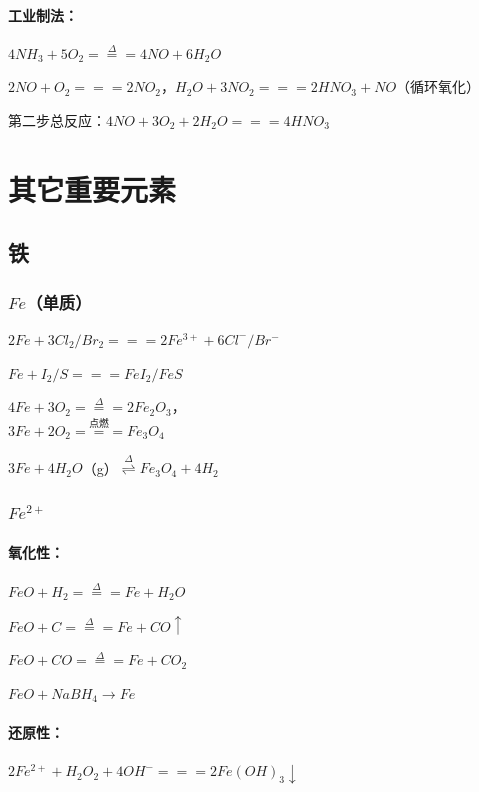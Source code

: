 \documentclass[UTF8,zihao=-4,openany]{ctexbook}
\begin{document}
\subsubsection{工业制法：}
$4NH_3+5O_2\stackrel{\Delta}{=\!=\!=}4NO+6H_2O$\par

$2NO+O_2=\!=\!=2NO_2$，$H_2O+3NO_2=\!=\!=2HNO_3+NO$（循环氧化）\par

第二步总反应：$4NO+3O_2+2H_2O=\!=\!=4HNO_3$\par
\chapter{其它重要元素}
\section{铁}
\subsection{$Fe$（单质）}
$2Fe+3Cl_2/Br_2=\!=\!=2Fe^{3+}+6Cl^-/Br^-$\par

$Fe+I_2/S=\!=\!=FeI_2/FeS$\par

$4Fe+3O_2\stackrel{\Delta}{=\!=\!=}2Fe_2O_3$，\\[0.25em]
\hspace*{2em}$3Fe+2O_2\stackrel{\mbox{点燃}}{=\!=\!=}Fe_3O_4$\par

$3Fe+4H_2O$（g）$\stackrel{\Delta}{\rightleftharpoons}Fe_3O_4+4H_2$\par
\subsection{$Fe^{2+}$}
\subsubsection{氧化性：}
$FeO+H_2\stackrel{\Delta}{=\!=\!=}Fe+H_2O$\par

$FeO+C\stackrel{\Delta}{=\!=\!=}Fe+CO\uparrow$\par

$FeO+CO\stackrel{\Delta}{=\!=\!=}Fe+CO_2$\par

$FeO+NaBH_4\rightarrow Fe$\par
\subsubsection{还原性：}
$2Fe^{2+}+H_2O_2+4OH^-=\!=\!=2Fe(OH)_3\downarrow$\par
\end{document}
